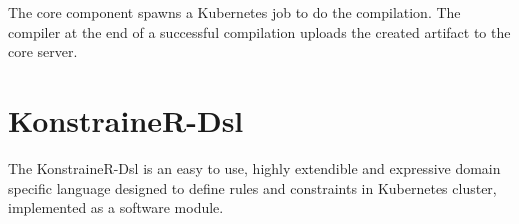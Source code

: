 The core component spawns a Kubernetes job to do the compilation. The compiler at the end of a successful compilation uploads the created artifact to the core server.

\section{KonstraineR-Dsl}

The KonstraineR-Dsl is an easy to use, highly extendible and expressive domain specific language designed to define rules and constraints in Kubernetes cluster, implemented as a software module.

